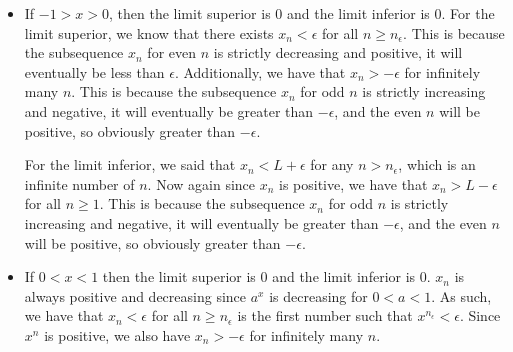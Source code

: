\documentclass{article}%
\begin{document}
\begin{enumerate}
\begin{enumerate}
\begin{itemize}
            \item If $-1 > x > 0$, then the limit superior is 0 and the limit inferior is 0. For the limit superior, we know that there exists $x_n < \epsilon$ for all $n \geq n_\epsilon$. This is because the subsequence $x_n$ for even $n$ is strictly decreasing and positive, it will eventually be less than $\epsilon$. Additionally, we have that $x_n > -\epsilon$ for infinitely many $n$. This is because the subsequence $x_n$ for odd $n$ is strictly increasing and negative, it will eventually be greater than $-\epsilon$, and the even $n$ will be positive, so obviously greater than $-\epsilon$.
            
            For the limit inferior, we said that $x_n < L + \epsilon$ for any $n > n_\epsilon$, which is an infinite number of $n$. Now again since $x_n$ is positive, we have that $x_n > L - \epsilon$ for all $n \geq 1$. This is because the subsequence $x_n$ for odd $n$ is strictly increasing and negative, it will eventually be greater than $-\epsilon$, and the even $n$ will be positive, so obviously greater than $-\epsilon$.
            \item If $0 < x < 1$ then the limit superior is 0 and the limit inferior is 0. $x_n$ is always positive and decreasing since $a^x$ is decreasing for $0 < a < 1$. As such, we have that $x_n < \epsilon$ for all $n \geq n_\epsilon$ is the first number such that $x^{n_\epsilon} < \epsilon$. Since $x^n$ is positive, we also have $x_n > -\epsilon$ for infinitely many $n$. 
            

\end{itemize}
\end{enumerate}
\end{enumerate}
\end{document}
